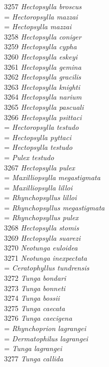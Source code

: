 \documentclass[
]{article}
\begin{document}
3257 \emph{Hectopsylla broscus}\\
= \emph{Hectoropsylla mazzai}\\
= \emph{Hectopsylla mazzai}\\
3258 \emph{Hectopsylla coniger}\\
3259 \emph{Hectopsylla cypha}\\
3260 \emph{Hectopsylla eskeyi}\\
3261 \emph{Hectopsylla gemina}\\
3262 \emph{Hectopsylla gracilis}\\
3263 \emph{Hectopsylla knighti}\\
3264 \emph{Hectopsylla narium}\\
3265 \emph{Hectopsylla pascuali}\\
3266 \emph{Hectopsylla psittaci}\\
= \emph{Hectoropsylla testudo}\\
= \emph{Hectopsylla pyttaci}\\
= \emph{Hectopsylla testudo}\\
= \emph{Pulex testudo}\\
3267 \emph{Hectopsylla pulex}\\
= \emph{Maxilliopsylla megastigmata}\\
= \emph{Maxilliopsylla lilloi}\\
= \emph{Rhynchopsyllus lilloi}\\
= \emph{Rhynchopsyllus megastigmata}\\
= \emph{Rhynchopsyllus pulex}\\
3268 \emph{Hectopsylla stomis}\\
3269 \emph{Hectopsylla suarezi}\\
3270 \emph{Neotunga euloidea}\\
3271 \emph{Neotunga inexpectata}\\
= \emph{Ceratophyllus tundrensis}\\
3272 \emph{Tunga bondari}\\
3273 \emph{Tunga bonneti}\\
3274 \emph{Tunga bossii}\\
3275 \emph{Tunga caecata}\\
3276 \emph{Tunga caecigena}\\
= \emph{Rhynchoprion lagrangei}\\
= \emph{Dermatophilus lagrangei}\\
= \emph{Tunga lagrangei}\\
3277 \emph{Tunga callida}\\
\end{document}
